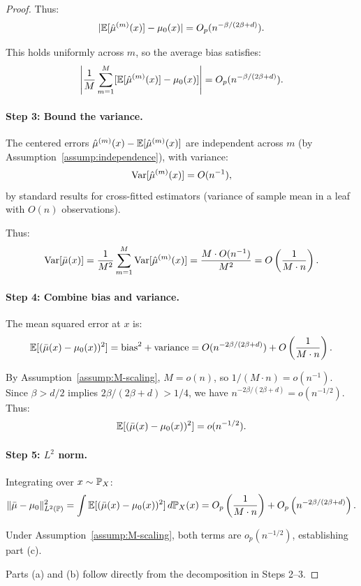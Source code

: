 \documentclass[12pt]{article}
\begin{document}
\begin{proof}
Thus:
\[
|\mathbb{E}[\hat{\mu}^{(m)}(x)] - \mu_0(x)| = O_p(n^{-\beta/(2\beta+d)}).
\]

This holds uniformly across $m$, so the average bias satisfies:
\[
\left|\frac{1}{M} \sum_{m=1}^M [\mathbb{E}[\hat{\mu}^{(m)}(x)] - \mu_0(x)]\right| = O_p(n^{-\beta/(2\beta+d)}).
\]

\paragraph{Step 3: Bound the variance.}
The centered errors $\hat{\mu}^{(m)}(x) - \mathbb{E}[\hat{\mu}^{(m)}(x)]$ are independent across $m$ (by Assumption~\ref{assump:independence}), with variance:
\[
\operatorname{Var}[\hat{\mu}^{(m)}(x)] = O(n^{-1}),
\]
by standard results for cross-fitted estimators (variance of sample mean in a leaf with $O(n)$ observations).

Thus:
\[
\operatorname{Var}[\bar{\mu}(x)] = \frac{1}{M^2} \sum_{m=1}^M \operatorname{Var}[\hat{\mu}^{(m)}(x)] = \frac{M \cdot O(n^{-1})}{M^2} = O\left(\frac{1}{M \cdot n}\right).
\]

\paragraph{Step 4: Combine bias and variance.}
The mean squared error at $x$ is:
\[
\mathbb{E}[(\bar{\mu}(x) - \mu_0(x))^2] = \text{bias}^2 + \text{variance} = O(n^{-2\beta/(2\beta+d)}) + O\left(\frac{1}{M \cdot n}\right).
\]

By Assumption~\ref{assump:M-scaling}, $M = o(n)$, so $1/(M \cdot n) = o(n^{-1})$. Since $\beta > d/2$ implies $2\beta/(2\beta+d) > 1/4$, we have $n^{-2\beta/(2\beta+d)} = o(n^{-1/2})$. Thus:
\[
\mathbb{E}[(\bar{\mu}(x) - \mu_0(x))^2] = o(n^{-1/2}).
\]

\paragraph{Step 5: $L^2$ norm.}
Integrating over $x \sim \mathbb{P}_X$:
\[
\|\bar{\mu} - \mu_0\|_{L^2(\mathbb{P})}^2 = \int \mathbb{E}[(\bar{\mu}(x) - \mu_0(x))^2] \, d\mathbb{P}_X(x) = O_p\left(\frac{1}{M \cdot n}\right) + O_p\left(n^{-2\beta/(2\beta+d)}\right).
\]

Under Assumption~\ref{assump:M-scaling}, both terms are $o_p(n^{-1/2})$, establishing part (c).

Parts (a) and (b) follow directly from the decomposition in Steps 2--3.
\end{proof}
\end{document}
